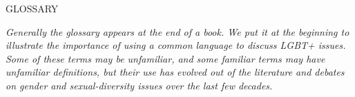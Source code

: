 %

\begin{titlepage}
\setcounter{page}{9}
\hfill\Large{GLOSSARY}
\label{glossary}		%
\normalsize			%
\vspace*{\baselineskip}

\emph{Generally the glossary appears at the end of a book.  We put it at the beginning to illustrate the importance of using a common language to discuss LGBT+ issues.  Some of these terms may be unfamiliar, and some familiar terms may have unfamiliar definitions, but their use has evolved out of the literature and debates on gender and sexual-diversity issues over the last few decades.}\vspace*{\baselineskip}





\end{titlepage}
